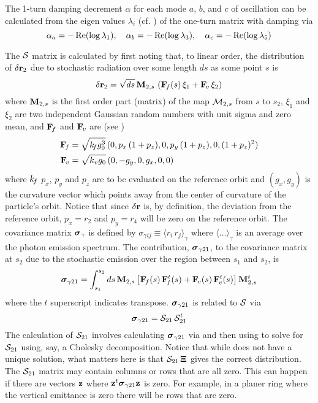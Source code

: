 The 1-turn damping decrement $\alpha$ for each mode $a$, $b$, and $c$ of oscillation can be
calculated from the eigen values $\lambda_i$ (cf. ) of the one-turn matrix with damping via
\begin{equation}
  \alpha_a = -\operatorname{Re}(\log\lambda_1), \quad 
  \alpha_b = -\operatorname{Re}(\log\lambda_3), \quad 
  \alpha_c = -\operatorname{Re}(\log\lambda_5)
  \label{allall}
\end{equation}

The ${\cal S}$ matrix is calculated by first noting that, to linear order, the distribution of
$\delta{\bf r}_2$ due to stochastic radiation over some length $ds$ as some point $s$ is
\begin{equation}
  \delta{\bf r}_2 = \sqrt{ds} \, {\bf M}_{2,s} \, \left( {\bf F}_{\mkern-3 mu{f}}(s) \, \xi_1 + {\bf F}_{\mkern-3 mu{v}} \, \xi_2 \right)
\end{equation}
where ${\bf M}_{2,s}$ is the first order part (matrix) of the map ${\cal M}_{2,s}$ from $s$ to $s_2$,
$\xi_1$ and $\xi_2$ are two independent Gaussian random numbers with unit sigma and zero mean, and
${\bf F}_{\mkern-3 mu{f}}$ and ${\bf F}_{\mkern-3 mu{v}}$ are (see )
\begin{align}
  {\bf F}_{\mkern-3 mu{f}} &= \sqrt{k_{\mkern-3 mu{f}} g_0^3} \, (0, p_x \, (1 + p_z), 0, p_y \, (1 + p_z), 0, (1 + p_z)^2) \\
  {\bf F}_{\mkern-3 mu{v}} &= \sqrt{k_v g_0} \, (0, -g_y, 0, g_x, 0, 0)
  \label{fk000}
\end{align}
where $k_{\mkern-3 mu{f}}$ $p_x$, $p_y$ and $p_z$ are to be evaluated on the reference orbit and $(g_x, g_y)$ is the
curvature vector which points away from the center of curvature of the particle's orbit. Notice that since
$\delta{\bf r}$ is, by definition, the deviation from the reference orbit, $p_x = r_2$ and $p_y = r_4$
will be zero on the reference orbit. The covariance matrix ${\boldsymbol{\sigma}}_\gamma$ is defined by
$\sigma_{\gamma ij} \equiv \langle r_i \, r_j \rangle_\gamma$ where $\langle \ldots \rangle_\gamma$
is an average over the photon emission spectrum. The contribution, ${\boldsymbol{\sigma}}_{\gamma21}$, to the
covariance matrix at $s_2$ due to the stochastic emission over the region between $s_1$ and $s_2$,
is
\begin{equation}
  {\boldsymbol{\sigma}}_{\gamma21} = \int_{s_1}^{s_2} ds \, 
    {\bf M}_{2,s} \, \big[ 
    {\bf F}_{\mkern-3 mu{f}}(s) \, {\bf F}_{\mkern-3 mu{f}}^t(s) + {\bf F}_{\mkern-3 mu{v}}(s) \, {\bf F}_{\mkern-3 mu{v}}^t(s) \big] \, {\bf M}_{2,s}^t
  \label{smvvm}
\end{equation}
where the $t$ superscript indicates transpose. ${\boldsymbol{\sigma}}_{\gamma21}$ is related to ${\cal S}$ via
\begin{equation}
  {\boldsymbol{\sigma}}_{\gamma21} = {\cal S}_{21} \, {\cal S}_{21}^t
  \label{sxx}
\end{equation}
The calculation of ${\cal S}_{21}$ involves calculating ${\boldsymbol{\sigma}}_{\gamma21}$ via  and then
using  to solve for ${\cal S}_{21}$ using, say, a Cholesky decomposition. Notice that while
 does not have a unique solution, what matters here is that ${\cal S}_{21} \, {\bf \Xi}$ gives
the correct distribution. The ${\cal S}_{21}$ matrix may contain columns or rows that are all
zero. This can happen if there are vectors ${\bf z}$ where ${\bf z}^t {\boldsymbol{\sigma}}_{\gamma21} {\bf z}$ is zero. For
example, in a planer ring where the vertical emittance is zero there will be rows that are zero.

